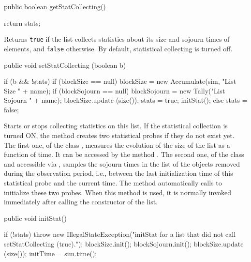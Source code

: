 \begin{code}

  public boolean getStatCollecting()\begin{hide} {
     return stats;
  }\end{hide}
\end{code}
\begin{tabb}   Returns \texttt{true} if the list collects statistics
  about its size and sojourn times of elements, and
  \texttt{false} otherwise.
  By default, statistical collecting is turned off.
\end{tabb}
\begin{htmlonly}
\end{htmlonly}
\begin{code}

  public void setStatCollecting (boolean b)\begin{hide} {
    if (b && !stats) {
      if (blockSize == null)
      blockSize = new Accumulate(sim, "List Size " + name);
      if (blockSojourn == null)
      blockSojourn = new Tally("List Sojourn " + name);
      blockSize.update (size());
      stats = true;
      initStat();
    } else
    stats = false;
  }\end{hide}
\end{code}
  \begin{tabb}  Starts or stops collecting statistics on this list.
   If the statistical collection is turned ON, the method
   creates two statistical probes if they do not exist yet.
   The first one, of the class , measures the evolution
   of the size of the list as a function of time.
   It can be accessed by the method .
   The second one, of the class   and accessible via
   , samples the sojourn times in the list of the
   objects removed during the observation period,
   i.e., between the last initialization time of this statistical
   probe and the current time.
   The method automatically calls  to
   initialize these two probes.
   When this method is used, it is normally invoked immediately after
   calling the constructor of the list.
  \end{tabb}
\begin{htmlonly}
\end{htmlonly}
\begin{code}

   public void initStat() \begin{hide} {
    if (!stats)
    throw new IllegalStateException("initStat for a list that did not call setStatCollecting (true).");
    blockSize.init();
    blockSojourn.init();
    blockSize.update (size());
    initTime = sim.time();
  }\end{hide}
\end{code}
